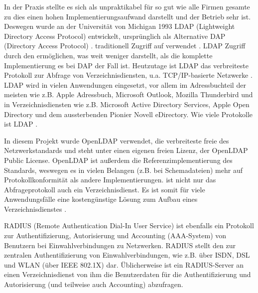 \documentclass[11pt,a4paper,titlepage=firstiscover]{scrartcl} %
\begin{document}
In der Praxis stellte es sich als unpraktikabel für so gut wie alle Firmen 
  
gesamte  zu  dies 
einen hohen Implementierungsaufwand darstellt und der Betrieb sehr  ist. Deswegen wurde an der Universität von 
Michigan 1993  LDAP (Lightweight Directory Access Protocol) entwickelt,
 ursprünglich als  
Alternative  DAP (Directory Access Protocol) . 
  traditionell  Zugriff auf 
 verwendet .\newline
{} LDAP  Zugriff durch 
den   ermöglichen, was weit weniger 
 darstellt, als die komplette 
Implementierung   es bei DAP der 
Fall ist. Heutzutage ist LDAP das verbreiteste Protokoll zur Abfrage von 
Verzeichnisdiensten, u.a.  TCP/IP-basierte Netzwerke . 
 LDAP wird in vielen Anwendungen eingesetzt, vor allem im Adressbuchteil 
der meisten  wie z.B. Apple Adressbuch, Microsoft Outlook, 
Mozilla Thunderbird und in Verzeichnisdiensten wie z.B. Microsoft Active 
Directory Services, Apple Open Directory und dem aussterbenden Pionier Novell 
eDirectory. Wie viele Protokolle ist LDAP .

In diesem Projekt wurde OpenLDAP verwendet, die verbreiteste freie  des Netzwerkstandards und steht unter einen eigenen 
freien Lizenz, der OpenLDAP Public License. OpenLDAP ist außerdem die 
Referenzimplementierung des Standards, weswegen es in vielen Belangen (z.B. bei 
Schemadateien) mehr auf Protokollkonformität  
als andere Implementierungen.   ist nicht 
nur das Abfrageprotokoll  auch ein Verzeichnisdienst. 
Es ist somit für viele Anwendungsfälle eine kostengünstige Lösung zum Aufbau 
eines Verzeichnisdienstes .

RADIUS (Remote Authentication Dial-In User Service) ist ebenfalls ein 
 Protokoll zur Authentifizierung, Autorisierung und 
 Accounting (AAA-System) von Benutzern bei Einwahlverbindungen zu 
Netzwerken. RADIUS stellt den  zur 
zentralen Authentifizierung von Einwahlverbindungen, wie z.B. über ISDN, DSL 
und WLAN (über IEEE 802.1X) dar. Üblicherweise ist ein RADIUS-Server an einen 
Verzeichnisdienst  von ihm die Benutzerdaten für die 
Authentifizierung und Autorisierung (und teilweise auch  
Accounting) abzufragen.
\end{document}
